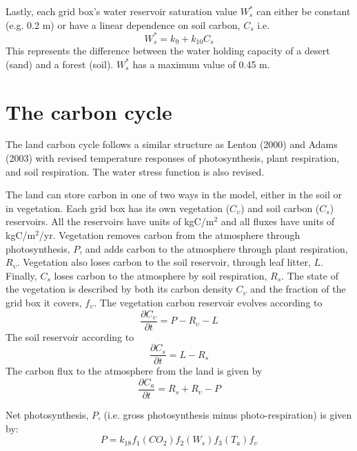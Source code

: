 \documentclass[10pt,a4paper]{report}
\begin{document}
Lastly, each grid box's water reservoir saturation value $W_{s}^*$
can either be constant (e.g. 0.2 m) or have a linear dependence on
soil carbon, $C_s$ i.e.
\begin{equation}
W_{s}^* =k_9 + k_{10} C_{s}
\end{equation}
This represents the difference between the water holding capacity
of a desert (sand) and a forest (soil). $W_{s}^*$ has a maximum
value of 0.45 m.

\section{The carbon cycle}

The land carbon cycle follows a similar structure as Lenton (2000)
\cite{Lenton} and Adams (2003) \cite{Adams} with revised
temperature responses of photosynthesis, plant respiration, and
soil respiration. The water stress function is also revised.

The land can store carbon in one of two ways in the model, either
in the soil or in vegetation. Each grid box has its own vegetation
($C_{\upsilon}$) and soil carbon ($C_s$) reservoirs. All the
reservoirs have units of kgC/m$^2$ and all fluxes have units of
kgC/m$^2$/yr. Vegetation removes carbon from the atmosphere
through photosynthesis, $P$, and adds carbon to the atmosphere
through plant respiration, $R_{\upsilon}$. Vegetation also loses
carbon to the soil reservoir, through leaf litter, $L$. Finally,
$C_s$ loses carbon to the atmosphere by soil respiration, $R_s$.
The state of the vegetation is described by both its carbon
density $C_{\upsilon}$ and the fraction of the grid box it covers,
$f_{\upsilon}$. The vegetation carbon reservoir evolves according
to
\begin{equation}
\frac{\partial C_{\upsilon}}{\partial t} = P - R_{\upsilon} - L
\end{equation}
The soil reservoir according to
\begin{equation}
\frac{\partial C_{s}}{\partial t} = L - R_s
\end{equation}
The carbon flux to the atmosphere from the land is given by
\begin{equation}
\frac{\partial C_{a}}{\partial t} = R_s + R_{\upsilon} - P
\end{equation}

Net photosynthesis, $P$, (i.e. gross photosynthesis minus
photo-respiration) is given by:
\begin{equation}
P= k_{18} f_1(CO_2) f_2(W_s) f_3(T_a) f_{\upsilon}
\end{equation}
\end{document}
